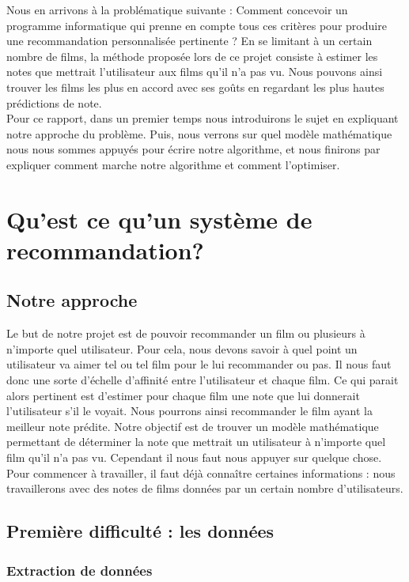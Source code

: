 \documentclass[a4paper,10pt]{article}
\begin{document}
Nous en arrivons à la problématique suivante : Comment concevoir un programme informatique 
qui prenne en compte tous ces critères pour produire une recommandation personnalisée pertinente ?
En se limitant à un certain nombre de films, la méthode proposée lors de ce projet consiste à estimer les notes que mettrait l’utilisateur aux films qu'il n'a pas vu.
Nous pouvons ainsi trouver les films les plus en accord avec ses goûts en regardant les plus hautes prédictions de note.\\
Pour ce rapport, dans un premier temps nous introduirons le sujet en expliquant notre approche du problème.
Puis, nous verrons sur quel modèle mathématique nous nous sommes appuyés pour écrire notre algorithme, et nous finirons par expliquer comment marche notre algorithme et comment l’optimiser.

\section{Qu'est ce qu'un système de recommandation?}

\subsection{Notre approche}

Le but de notre projet est de pouvoir recommander un film ou plusieurs à n'importe quel utilisateur. 
Pour cela, nous devons savoir à quel point un utilisateur va aimer tel ou tel film pour le lui recommander ou pas. 
Il nous faut donc une sorte d'échelle d'affinité entre l'utilisateur et chaque film. Ce qui parait alors pertinent est d'estimer pour chaque film une note que lui donnerait l'utilisateur s'il le voyait. 
Nous pourrons ainsi recommander le film ayant la meilleur note prédite.
Notre objectif est de trouver un modèle mathématique permettant de déterminer la note que mettrait un utilisateur à n'importe quel film qu'il n'a pas vu. Cependant il nous faut nous appuyer sur quelque chose. Pour commencer à travailler, il faut déjà connaître certaines informations : nous travaillerons avec des notes de films données par un certain nombre d'utilisateurs.

\subsection{Première difficulté : les données}
\subsubsection{Extraction de données}
\end{document}
